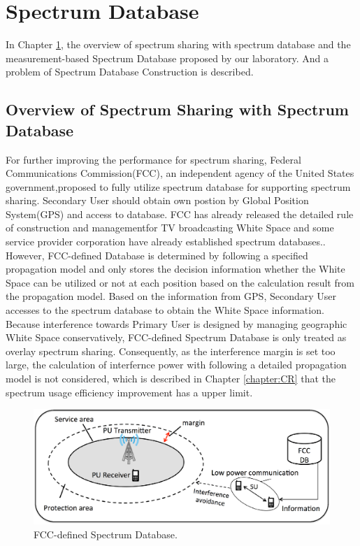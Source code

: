 \chapter[Spectrum Database]{Spectrum Database}
\label{chapter:Database}
In Chapter \ref{chapter:Database}, the overview of spectrum sharing with spectrum database and the measurement-based Spectrum Database proposed by our laboratory. And a problem of Spectrum Database Construction is described.

\section{Overview of Spectrum Sharing with Spectrum Database}
For further improving the performance for spectrum sharing, Federal Communications Commission(FCC), an independent agency of the United States government,proposed to fully utilize spectrum database for supporting spectrum sharing. Secondary User should obtain own postion by Global Position System(GPS) and access to database. FCC has already released the detailed rule of construction and managementfor TV broadcasting White Space and some service provider corporation have already established spectrum databases.\cite{ref:fcc,ref:google,ref:microsoft}. However, FCC-defined Database is determined by following a specified propagation model and only stores the decision information whether the White Space can be utilized or not at each position based on the calculation result from the propagation model. Based on the information from GPS, Secondary User accesses to the spectrum database to obtain the White Space information. Because interference towards Primary User is designed by managing geographic White Space conservatively, FCC-defined Spectrum Database is only treated as overlay spectrum sharing. Consequently, as the interference margin is set too large, the calculation of interfernce power with following a detailed propagation model is not considered, which is described in Chapter \ref{chapter:CR} that the spectrum usage efficiency improvement has a upper limit.
\begin{figure}[!htp]
\begin{center}
\includegraphics[width=120mm,clip]{fcc_sdb.eps}
\caption{FCC-defined Spectrum Database.}
\label{fig:fcc-defined_sdb}
\end{center}
\end{figure}

